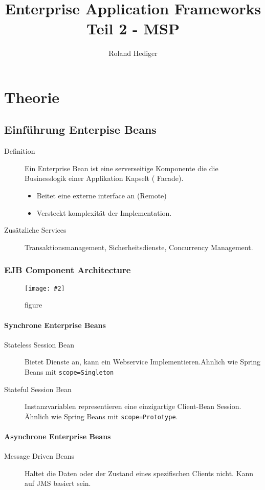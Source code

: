 \documentclass[a4paper,10pt]{scrreprt}
\title{Enterprise Application Frameworks Teil 2 - MSP}
\author{Roland Hediger}
\newcommand{\pic}[2][figure]{\begin{figure}[h]
 \centering
 \texttt{[image: \#2]}
 \caption{#1}
\end{figure}
}
\begin{document}
\maketitle
\tableofcontents
\newpage
 \pagestyle{fancy}
\part{Theorie}

\chapter{Einführung  Enterpise Beans}

\begin{description}
 \item [Definition] Ein Enterprise Bean ist eine serverseitige Komponente die die Businesslogik einer Applikation Kapselt ( Facade).
 \begin{itemize}
  \item Beitet eine externe interface an (Remote)
  \item Versteckt komplexität der Implementation.
 \end{itemize}
\item [Zusätzliche Services] Transaktionsmanagement, Sicherheitsdienste, Concurrency Management.
\end{description}

\section{EJB Component Architecture}
\pic{ejbca.png}

\subsection{Synchrone Enterprise Beans}
\begin{description}
 \item [Stateless Session Bean] Bietet Dienste an, kann ein Webservice Implementieren.Ahnlich wie Spring Beans mit \texttt{scope=Singleton}
 \item [Stateful Session Bean] Instanzvariablen representieren eine einzigartige Client-Bean Session. Ähnlich wie Spring Beans mit \texttt{scope=Prototype}.
\end{description}

\subsection{Asynchrone Enterprise Beans}
\begin{description}
 \item [Message Driven Beans] Haltet die Daten oder der Zustand eines spezifischen Clients nicht. Kann auf JMS basiert sein.
\end{description}
\end{document}
